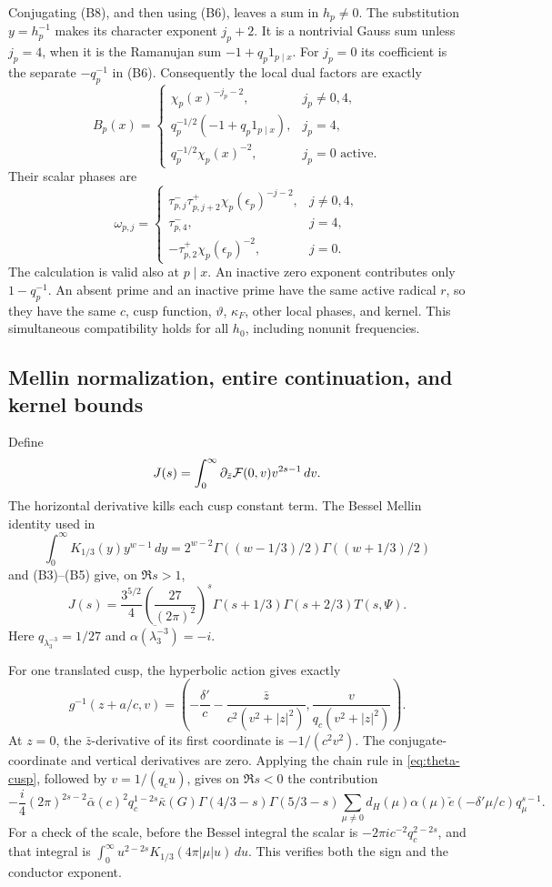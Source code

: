 \documentclass[12pt]{article}
\begin{document}
Conjugating (B8), and then using (B6), leaves a sum in \(h_p\ne0\).
The substitution \(y=h_p^{-1}\) makes its character exponent \(j_p+2\).
It is a nontrivial Gauss sum unless \(j_p=4\), when it is the
Ramanujan sum \(-1+q_p1_{p\mid x}\).
For \(j_p=0\) its coefficient is the separate \(-q_p^{-1}\)
in (B6).  Consequently the local dual factors are exactly
\[
 B_p(x)=
 \begin{cases}
  \chi_p(x)^{-j_p-2},&j_p\ne0,4,\\
  q_p^{-1/2}(-1+q_p1_{p\mid x}),&j_p=4,\\
  q_p^{-1/2}\chi_p(x)^{-2},&j_p=0\text{ active}.
 \end{cases}
 \tag{B10}
\]
Their scalar phases are
\[
 \omega_{p,j}=
 \begin{cases}
 \tau_{p,j}^-\tau_{p,j+2}^+\chi_p(\epsilon_p)^{-j-2},
                         &j\ne0,4,\\
 \tau_{p,4}^-,&j=4,\\
 -\tau_{p,2}^+\chi_p(\epsilon_p)^{-2},&j=0 .
 \end{cases}
\]
The calculation is valid also at \(p\mid x\).
An inactive zero exponent contributes only \(1-q_p^{-1}\).
An absent prime and an inactive prime have the same active
radical \(r\), so they have the same \(c\), cusp function,
\(\vartheta\), \(\kappa_F\), other local phases, and kernel.
This simultaneous compatibility holds for all \(h_0\), including
nonunit frequencies.

\subsection{Mellin normalization, entire continuation, and kernel bounds}

Define
\[
 J(s)=\int_0^\infty
      \partial_{\bar z}{\cal F}(0,v)v^{2s-1}\,dv.
\]
The horizontal derivative kills each cusp constant term.
The Bessel Mellin identity used in \cite[Lemma 5.3]{DR}
\[
 \int_0^\infty K_{1/3}(y)y^{w-1}\,dy
     =2^{w-2}\Gamma((w-1/3)/2)\Gamma((w+1/3)/2)
\]
and (B3)--(B5) give, on \(\Re s>1\),
\[
 J(s)=\frac{3^{5/2}}4
       \left(\frac{27}{(2\pi)^2}\right)^s
       \Gamma(s+1/3)\Gamma(s+2/3)T(s,\Psi).
 \tag{B11}\label{eq:direct-mellin-proof}
\]
Here \(q_{\lambda_3^{-3}}=1/27\) and
\(\overline{\alpha(\lambda_3^{-3})}=-i\).

For one translated cusp, the hyperbolic action gives exactly
\[
 g^{-1}(z+a/c,v)
 =\left(-\frac{\delta'}c-\frac{\bar z}{c^2(v^2+|z|^2)},
             \frac{v}{q_c(v^2+|z|^2)}\right).
\]
At \(z=0\), the \(\bar z\)-derivative of its first coordinate
is \(-1/(c^2v^2)\).  The conjugate-coordinate and vertical
derivatives are zero.
Applying the chain rule in \eqref{eq:theta-cusp}, followed by
\(v=1/(q_cu)\), gives on \(\Re s<0\) the contribution
\[
 -\frac i4(2\pi)^{2s-2}\bar\alpha(c)^2q_c^{1-2s}
 \bar\kappa(G)\Gamma(4/3-s)\Gamma(5/3-s)
 \sum_{\mu\ne0}d_H(\mu)\alpha(\mu)
            \check e(-\delta'\mu/c)q_\mu^{s-1}.
 \tag{B12}
\]
For a check of the scale, before the Bessel integral the scalar is
\(-2\pi i c^{-2}q_c^{2-2s}\), and that integral is
\(\int_0^\infty u^{2-2s}K_{1/3}(4\pi|\mu|u)\,du\).
This verifies both the sign and the conductor exponent.
\end{document}
